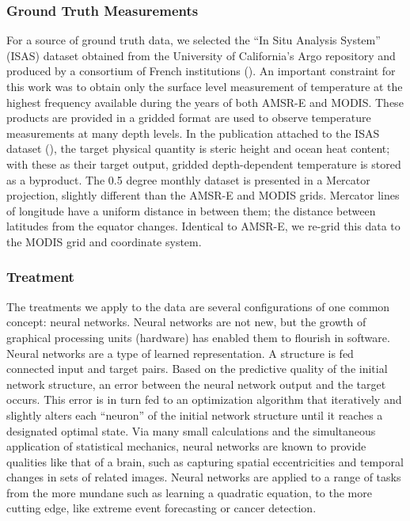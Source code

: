 \begin{refsection}
\subsubsection{Ground Truth Measurements}
For a source of ground truth data, we selected the “In Situ Analysis System” (ISAS) dataset obtained from the University of California’s Argo repository and produced by a consortium of French institutions (\cite{gaillard2016situ}). An important constraint for this work was to obtain only the surface level measurement of temperature at the highest frequency available during the years of both AMSR-E and MODIS. These products are provided in a gridded format are used to observe temperature measurements at many depth levels. In the publication attached to the ISAS dataset (\cite{gaillard2016situ}), the target physical quantity is steric height and ocean heat content; with these as their target output, gridded depth-dependent temperature is stored as a byproduct. The 0.5 degree monthly dataset is presented in a Mercator projection, slightly different than the AMSR-E and MODIS grids. Mercator lines of longitude have a uniform distance in between them; the distance between latitudes from the equator changes. Identical to AMSR-E, we re-grid this data to the MODIS grid and coordinate system.

\subsubsection{Treatment}
The treatments we apply to the data are several configurations of one common concept: neural networks. Neural networks are not new, but the growth of graphical processing units (hardware) has enabled them to flourish in software. Neural networks are a type of learned representation. A structure is fed connected input and target pairs. Based on the predictive quality of the initial network structure, an error between the neural network output and the target occurs. This error is in turn fed to an optimization algorithm that iteratively and slightly alters each “neuron” of the initial network structure until it reaches a designated optimal state. Via many small calculations and the simultaneous application of statistical mechanics, neural networks are known to provide qualities like that of a brain, such as capturing spatial eccentricities and temporal changes in sets of related images. Neural networks are applied to a range of tasks from the more mundane such as learning a quadratic equation, to the more cutting edge, like extreme event forecasting or cancer detection. 


\end{refsection}
